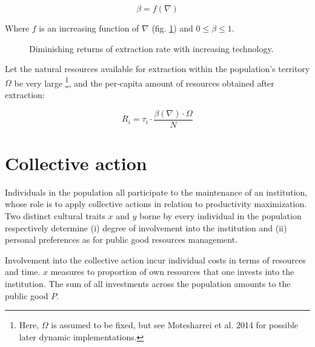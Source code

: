 \documentclass[a4paper]{article}
\begin{document}
\begin{equation}
\beta = f\left(\nabla\right)
\end{equation}
 
Where $f$ is an increasing function of $\nabla$ (fig. \ref{fig:betafunc}) and $0\leq\beta\leq1$.

\begin{figure}[!htbp]
	\begin{center}
	\end{center}
	\caption{Diminishing returns of extraction rate with increasing technology.}
	\label{fig:betafunc}
\end{figure} 

Let the natural resources available for extraction within the population's territory $\Omega$ be very large \footnote{Here, $\Omega$ is assumed to be fixed, but see Motesharrei et al. 2014 for possible later dynamic implementations.}, and the per-capita amount of resources obtained after extraction:

\begin{equation} \label{eq:resources}
	R_i = \tau_i\cdot\frac{\beta\left(\nabla\right)\cdot\Omega}{N}
\end{equation}

\section{Collective action}
\label{sec:collact}

Individuals in the population all participate to the maintenance of an institution, whose role is to apply collective actions in relation to productivity maximization. Two distinct cultural traits $x$ and $y$ borne by every individual in the population respectively determine (i) degree of involvement into the institution and (ii) personal preferences as for public good resources management.     

Involvement into the collective action incur individual costs in terms of resources and time. $x$ measures to proportion of own resources that one invests into the institution. The sum of all investments across the population amounts to the public good $P$. 
\end{document}
